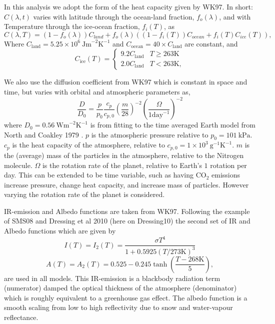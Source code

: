 \documentclass[12pt, onecolumn]{revtex4-2}    %
\newcommand{\heatcap}{\ensuremath{\ \text{Jm}^{-2} \text{K}^{-1}}}
\newcommand{\diffusion}{\ensuremath{\ \text{Wm}^{-2} \text{K}^{-1}}}
\begin{document}
In this analysis we adopt the form of the heat capacity given by WK97.
In short: $C(\lambda, t)$ varies with latitude through the ocean-land fraction, $f_o(\lambda)$, and with Temperature through the ice-ocean fraction, $f_i(T)$, as
$$
    C(\lambda, T) = (1 - f_o(\lambda)) C_{land} + f_o(\lambda) ((1-f_i(T)) C_{ocean} + f_i(T) C_{ice}(T)),
$$
Where $C_{\text{land}} = 5.25\times10^6 \heatcap$ and $C_{\text{ocean}} = 40 \times C_{\text{land}}$ are constant, and
$$
    C_{\text{ice}}(T) =
    \begin{cases}
        9.2 C_\text{land} & T \ge 263\text{K} \\
        2.0 C_\text{land} & T < 263\text{K},
    \end{cases}
$$

We also use the diffusion coefficient from WK97 which is constant in space and time, but varies with orbital and atmospheric parameters as,
$$
    \frac{D}{D_0} = \frac{p}{p_0} \frac{c_p}{c_{p,0}} \left(\frac{m}{28}\right)^{-2} \left(\frac{\Omega}{1 \text{day}^{-1}}\right)^{-2}
$$
where $D_0 = 0.56 \diffusion$ is from fitting to the time averaged Earth model from North and Coakley 1979 \cite{NC79}.
$p$ is the atmospheric pressure relative to $p_0 = 101 \ \text{kPa}$.
$c_p$ is the heat capacity of the atmosphere, relative to $c_{p,0} = 1\times10^3 \ \text{g}^{-1} \text{K}^{-1}$.
$m$ is the (average) mass of the particles in the atmosphere, relative to the Nitrogen molecule.
$\Omega$ is the rotation rate of the planet, relative to Earth's $1$ rotation per day.
This can be extended to be time variable, such as having CO$_2$ emissions increase pressure, change heat capacity, and increase mass of particles.
However varying the rotation rate of the planet is considered.

IR-emission and Albedo functions are taken from WK97. Following the example of SMS08 and Dressing et al 2010 (here on Dressing10) \cite{Dressing10} the second set of IR and Albedo functions which are given by
$$
    I(T) = I_2(T) = \frac{\sigma T^4}{1 + 0.5925 (T / 273 \text{K}) ^ 3}
$$
$$
    A(T) = A_2(T) = 0.525 - 0.245 \tanh\left(\frac{T - 268 \text{K}}{5}\right),
$$
are used in all models.
This IR-emission is a blackbody radiation term (numerator) damped the optical thickness of the atmosphere (denominator) which is roughly equivalent to a greenhouse gas effect.
The albedo function is a smooth scaling from low to high reflectivity due to snow and water-vapour reflectance.
\end{document}
